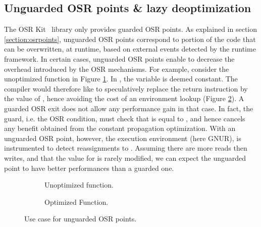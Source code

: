 \subsection{Unguarded OSR points \& lazy deoptimization}

The OSR Kit~\cite{OSRKit} library only provides guarded OSR points.
As explained in section \ref{section:osrpoints}, unguarded OSR points correspond to portion of the code that can be overwritten, at runtime, based on external events detected by the runtime framework.
In certain cases, unguarded OSR points enable to decrease the overhead introduced by the OSR mechanisms. 
For example, consider the unoptimized function in Figure \ref{fig:lazydeoptnorm}. 
In , the variable  is deemed constant. 
The compiler would therefore like to speculatively replace the return instruction by the value of , hence avoiding the cost of an environment lookup (Figure \ref{fig:lazydeoptopt}).
A guarded OSR exit does not allow any performance gain in that case.
In fact, the guard, i.e. the OSR condition, must check that  is equal to , and hence cancels any benefit obtained from the constant propagation optimization.
With an unguarded OSR point, however, the execution environment (here GNUR), is instrumented to detect reassignments to .
Assuming there are more reads then writes, and that the value for  is rarely modified, we can expect the unguarded point to have better performances than a guarded one.\\

\begin{figure}[h]
    \centering
    \begin{subfigure}{.49\textwidth}
        \caption{Unoptimized function.}
        \label{fig:lazydeoptnorm}
    \end{subfigure}
    \centering
    \begin{subfigure}{.49\textwidth}
        \caption{Optimized Function.}
        \label{fig:lazydeoptopt}   
    \end{subfigure}
    \caption{Use case for unguarded OSR points.}
    \label{fig:unguardedosrpointexample}
\end{figure}

